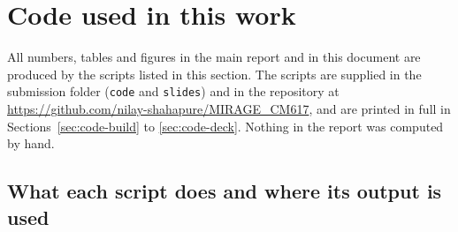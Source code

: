 \clearpage
\section{Code used in this work}
\label{sec:code}

All numbers, tables and figures in the main report and in this document are produced by the scripts listed in this section. The scripts are supplied in the submission folder (\texttt{code} and \texttt{slides}) and in the repository at \url{https://github.com/nilay-shahapure/MIRAGE_CM617}, and are printed in full in Sections~\ref{sec:code-build} to \ref{sec:code-deck}. Nothing in the report was computed by hand.

\subsection{What each script does and where its output is used}

